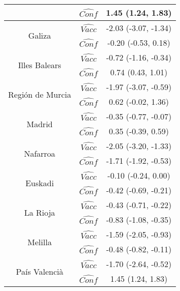 \documentclass{bmcart}
\begin{document}
\begin{backmatter}
\begin{table}[h]
\begin{tabular}{ccc}
                                & $\hat{Conf}$  & 1.45 (1.24, 1.83) \\
\hline
\multirow{2}{*}{Galiza}     & $\hat{Vacc}$  & -2.03 (-3.07, -1.34) \\
                            & $\hat{Conf}$  & -0.20 (-0.53, 0.18) \\
\hline
\multirow{2}{*}{Illes Balears}    & $\hat{Vacc}$  & -0.72 (-1.16, -0.34) \\
                                  & $\hat{Conf}$  & 0.74 (0.43, 1.01) \\
\hline
\multirow{2}{*}{Regi\'on de Murcia}    & $\hat{Vacc}$  & -1.97 (-3.07, -0.59) \\
                                       & $\hat{Conf}$  & 0.62 (-0.02, 1.36) \\
\hline
\multirow{2}{*}{Madrid}      & $\hat{Vacc}$  & -0.35 (-0.77, -0.07) \\
                             & $\hat{Conf}$  & 0.35 (-0.39, 0.59) \\
\hline
\multirow{2}{*}{Nafarroa}   & $\hat{Vacc}$  & -2.05 (-3.20, -1.33) \\
                            & $\hat{Conf}$  & -1.71 (-1.92, -0.53) \\
\hline
\multirow{2}{*}{Euskadi}    & $\hat{Vacc}$  & -0.10 (-0.24, 0.00) \\
                            & $\hat{Conf}$  & -0.42 (-0.69, -0.21) \\
\hline
\multirow{2}{*}{La Rioja}    & $\hat{Vacc}$  & -0.43 (-0.71, -0.22) \\
                             & $\hat{Conf}$  & -0.83 (-1.08, -0.35) \\
\hline
\multirow{2}{*}{Melilla}   & $\hat{Vacc}$  & -1.59 (-2.05, -0.93) \\
                           & $\hat{Conf}$  & -0.48 (-0.82, -0.11) \\
\hline
\multirow{2}{*}{Pa\'is Valenci\`a}    & $\hat{Vacc}$  & -1.70 (-2.64, -0.52) \\
                                      & $\hat{Conf}$  & 1.45 (1.24, 1.83) \\
\hline
\end{tabular}
\end{table}


\end{backmatter}
\end{document}
